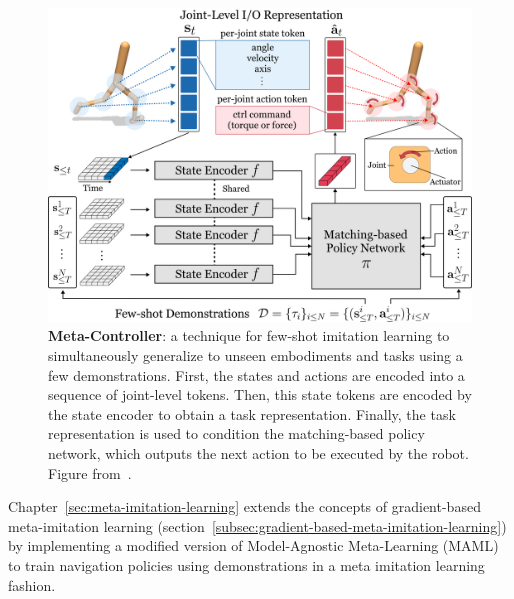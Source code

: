 \begin{figure}
    \centering
    \includegraphics[width=\textwidth]{figures/related_work/transformer_mil}
    \caption{\textbf{Meta-Controller}: a technique for few-shot imitation learning to simultaneously generalize to unseen embodiments and tasks using a few demonstrations.
    First, the states and actions are encoded into a sequence of joint-level tokens.
    Then, this state tokens are encoded by the state encoder to obtain a task representation.
    Finally, the task representation is used to condition the matching-based policy network, which outputs the next action to be executed by the robot.
    Figure from~\cite{cho2024metacontroller}.}
    \label{fig:transformer-mil}
\end{figure}

Chapter~\ref{sec:meta-imitation-learning} extends the concepts of gradient-based meta-imitation learning (section~\ref{subsec:gradient-based-meta-imitation-learning}) by implementing a modified version of Model-Agnostic Meta-Learning (MAML)~\cite{finn2017} to train navigation policies using demonstrations in a meta imitation learning fashion.
